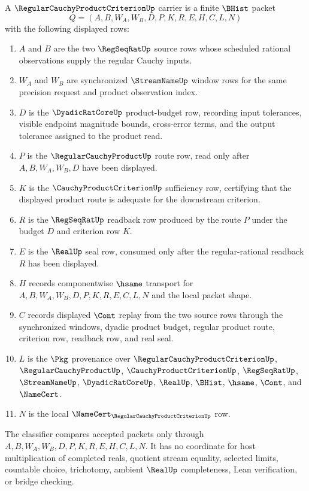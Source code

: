 \begin{definition}
\label{def:regular-cauchy-product-criterion-carrier}
A $\RegularCauchyProductCriterionUp$ carrier is a finite $\BHist$ packet
$$
Q=(A,B,W_A,W_B,D,P,K,R,E,H,C,L,N)
$$
with the following displayed rows:
\begin{enumerate}
\item $A$ and $B$ are the two $\RegSeqRatUp$ source rows whose scheduled rational observations supply the regular Cauchy inputs.
\item $W_A$ and $W_B$ are synchronized $\StreamNameUp$ window rows for the same precision request and product observation index.
\item $D$ is the $\DyadicRatCoreUp$ product-budget row, recording input tolerances, visible endpoint magnitude bounds, cross-error terms, and the output tolerance assigned to the product read.
\item $P$ is the $\RegularCauchyProductUp$ route row, read only after $A,B,W_A,W_B,D$ have been displayed.
\item $K$ is the $\CauchyProductCriterionUp$ sufficiency row, certifying that the displayed product route is adequate for the downstream criterion.
\item $R$ is the $\RegSeqRatUp$ readback row produced by the route $P$ under the budget $D$ and criterion row $K$.
\item $E$ is the $\RealUp$ seal row, consumed only after the regular-rational readback $R$ has been displayed.
\item $H$ records componentwise $\hsame$ transport for $A,B,W_A,W_B,D,P,K,R,E,C,L,N$ and the local packet shape.
\item $C$ records displayed $\Cont$ replay from the two source rows through the synchronized windows, dyadic product budget, regular product route, criterion row, readback row, and real seal.
\item $L$ is the $\Pkg$ provenance over $\RegularCauchyProductCriterionUp$, $\RegularCauchyProductUp$, $\CauchyProductCriterionUp$, $\RegSeqRatUp$, $\StreamNameUp$, $\DyadicRatCoreUp$, $\RealUp$, $\BHist$, $\hsame$, $\Cont$, and $\NameCert$.
\item $N$ is the local $\NameCert_{\RegularCauchyProductCriterionUp}$ row.
\end{enumerate}
The classifier compares accepted packets only through $A,B,W_A,W_B,D,P,K,R,E,H,C,L,N$. It has no coordinate for host multiplication of completed reals, quotient stream equality, selected limits, countable choice, trichotomy, ambient $\RealUp$ completeness, Lean verification, or bridge checking.
\end{definition}

